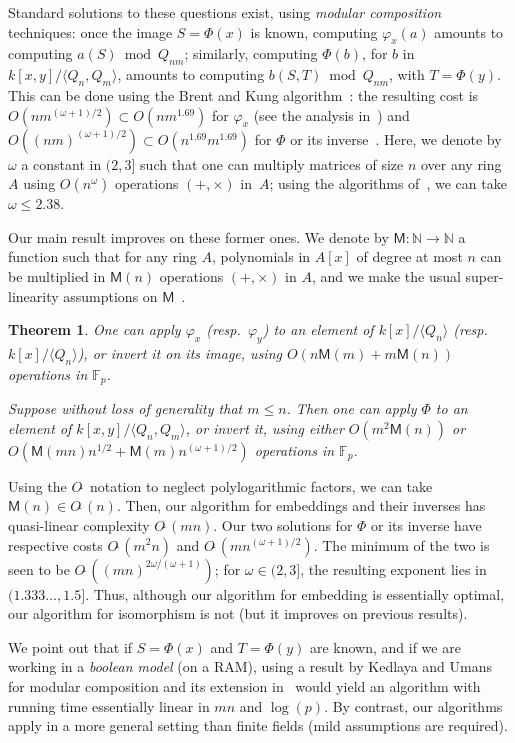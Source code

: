 \documentclass{sig-alternate}
\def\M {\ensuremath{\mathsf{M}}}
\def\N {\ensuremath{\mathbb{N}}}
\def\F {\ensuremath{\mathbb{F}}}
\newcounter{algo}
\newcommand{\ang}[1]{\langle#1\rangle}
\newtheorem{Theo}{Theorem}
\begin{document}
Standard solutions to these questions exist, using {\em modular
  composition} techniques: once the image $S=\Phi(x)$ is known,
computing $\varphi_x(a)$ amounts to computing $a(S) \bmod Q_{nm}$;
similarly, computing $\Phi(b)$, for $b$ in $k[x,y]/\ang{Q_n,Q_m}$,
amounts to computing $b(S,T) \bmod Q_{nm}$, with $T=\Phi(y)$.  This
can be done using the Brent and Kung algorithm~\cite{brent+kung}: the
resulting cost is $O(n m^{(\omega+1)/2}) \subset O(n m^{1.69})$ for
$\varphi_x$ (see the analysis in~\cite{shoup94}) and $O((n
m)^{(\omega+1)/2}) \subset O(n^{1.69} m^{1.69})$ for $\Phi$ or its
inverse~\cite{PoSc13b}. Here, we denote by $\omega$ a constant in
$(2,3]$ such that one can multiply matrices of size $n$ over any ring
  $A$ using $O(n^\omega)$ operations $(+,\times)$ in~$A$; using the
  algorithms of~\cite{coppersmith+winograd,Williams12}, we can take
  $\omega \le 2.38$.

Our main result improves on these former ones. We denote by $\M:\N \to
\N$ a function such that for any ring $A$, polynomials in $A[x]$ of
degree at most $n$ can be multiplied in $\M(n)$ operations
$(+,\times)$ in $A$, and we make the usual super-linearity assumptions
on $\M$~\cite[Chapter~8]{vzGG}.
\begin{Theo}\label{theo:main}
  One can apply $\varphi_x$ (resp.\ $\varphi_y$) to an element of
  $k[x]/\ang{Q_n}$ (resp.\ $k[x]/\ang{Q_n}$), or invert it on its
  image, using $O(n\M(m)+m\M(n))$ operations in $\F_p$.

  Suppose without loss of generality that $m \le n$. Then one can
  apply $\Phi$ to an element of $k[x,y]/\ang{Q_n, Q_m}$, or invert it, using either
  $O(m^2 \M(n))$ or $O(\M(mn)n^{1/2}+\M(m) n^{(\omega+1)/2} )$
  operations in $\F_p$.
\end{Theo}

Using the $O\tilde{~}$ notation to neglect polylogarithmic factors, we
can take $\M(n) \in O\tilde{~}(n)$.  Then, our algorithm for
embeddings and their inverses has quasi-linear complexity
$O\tilde{~}(mn)$. Our two solutions for $\Phi$ or its inverse have
respective costs $O\tilde{~}(m^2 n)$ and $O\tilde{~}(m
n^{(\omega+1)/2})$. The minimum of the two is seen to be $O\tilde{~}(
(mn)^{2\omega/(\omega+1)})$; for $\omega \in (2,3]$, the resulting
  exponent lies in $(1.333\dots, 1.5]$.  Thus, although our algorithm
    for embedding is essentially optimal, our algorithm for
    isomorphism is not (but it improves on previous results).

We point out that if $S=\Phi(x)$ and $T=\Phi(y)$ are known, and if we
are working in a {\em boolean model} (on a RAM), using a result by
Kedlaya and Umans~\cite{KeUm11} for modular composition and its
extension in~\cite{PoSc13a} would yield an algorithm with running time
essentially linear in $mn$ and $\log(p)$. By contrast, our algorithms
apply in a more general setting than finite fields (mild assumptions
are required).
\end{document}
